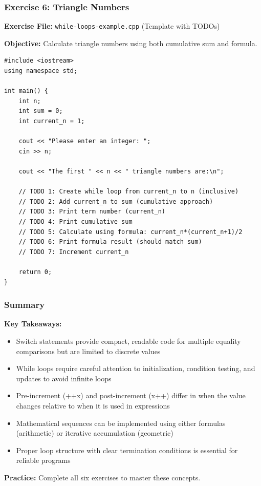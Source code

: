 \documentclass{beamer}
\begin{document}
\begin{frame}[fragile]
\frametitle{Exercise 6: Triangle Numbers}
\textbf{Exercise File:} \texttt{while-loops-example.cpp} (Template with TODOs)

\pause
\textbf{Objective:} Calculate triangle numbers using both cumulative sum and formula.

\begin{verbatim}
#include <iostream>
using namespace std;

int main() {
    int n;
    int sum = 0;
    int current_n = 1;
    
    cout << "Please enter an integer: ";
    cin >> n;
    
    cout << "The first " << n << " triangle numbers are:\n";
    
    // TODO 1: Create while loop from current_n to n (inclusive)
    // TODO 2: Add current_n to sum (cumulative approach)
    // TODO 3: Print term number (current_n)
    // TODO 4: Print cumulative sum
    // TODO 5: Calculate using formula: current_n*(current_n+1)/2
    // TODO 6: Print formula result (should match sum)
    // TODO 7: Increment current_n
    
    return 0;
}
\end{verbatim}
\end{frame}

\begin{frame}
\frametitle{Summary}
\textbf{Key Takeaways:}
\begin{itemize}
\item Switch statements provide compact, readable code for multiple equality comparisons but are limited to discrete values
\pause
\item While loops require careful attention to initialization, condition testing, and updates to avoid infinite loops
\pause
\item Pre-increment (++x) and post-increment (x++) differ in when the value changes relative to when it is used in expressions
\pause
\item Mathematical sequences can be implemented using either formulas (arithmetic) or iterative accumulation (geometric)
\pause
\item Proper loop structure with clear termination conditions is essential for reliable programs
\end{itemize}

\textbf{Practice:} Complete all six exercises to master these concepts.
\end{frame}
\end{document}
